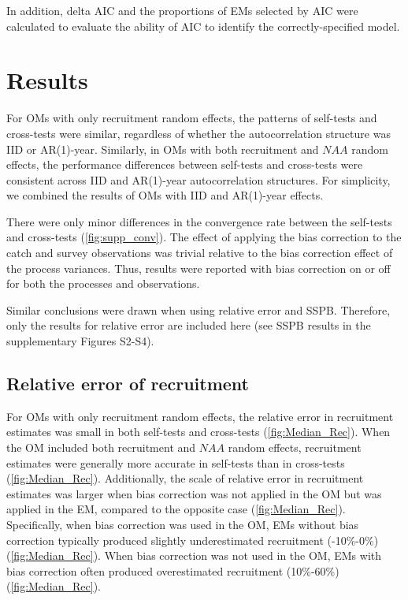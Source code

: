 \documentclass[
  12pt,
]{article}
\begin{document}
In addition, delta AIC and the proportions of EMs selected by AIC were
calculated to evaluate the ability of AIC to identify the
correctly-specified model.

\section{Results}\label{results}

For OMs with only recruitment random effects, the patterns of self-tests
and cross-tests were similar, regardless of whether the autocorrelation
structure was IID or AR(1)-year. Similarly, in OMs with both recruitment
and \(NAA\) random effects, the performance differences between
self-tests and cross-tests were consistent across IID and AR(1)-year
autocorrelation structures. For simplicity, we combined the results of
OMs with IID and AR(1)-year effects.

There were only minor differences in the convergence rate between the
self-tests and cross-tests (\autoref{fig:supp_conv}). The effect of
applying the bias correction to the catch and survey observations was
trivial relative to the bias correction effect of the process variances.
Thus, results were reported with bias correction on or off for both the
processes and observations.

Similar conclusions were drawn when using relative error and SSPB.
Therefore, only the results for relative error are included here (see
SSPB results in the supplementary Figures S2-S4).

\subsection{Relative error of
recruitment}\label{relative-error-of-recruitment}

For OMs with only recruitment random effects, the relative error in
recruitment estimates was small in both self-tests and cross-tests
(\autoref{fig:Median_Rec}). When the OM included both recruitment and
\(NAA\) random effects, recruitment estimates were generally more
accurate in self-tests than in cross-tests (\autoref{fig:Median_Rec}).
Additionally, the scale of relative error in recruitment estimates was
larger when bias correction was not applied in the OM but was applied in
the EM, compared to the opposite case (\autoref{fig:Median_Rec}).
Specifically, when bias correction was used in the OM, EMs without bias
correction typically produced slightly underestimated recruitment
(-10\%-0\%) (\autoref{fig:Median_Rec}). When bias correction was not
used in the OM, EMs with bias correction often produced overestimated
recruitment (10\%-60\%) (\autoref{fig:Median_Rec}).
\end{document}
